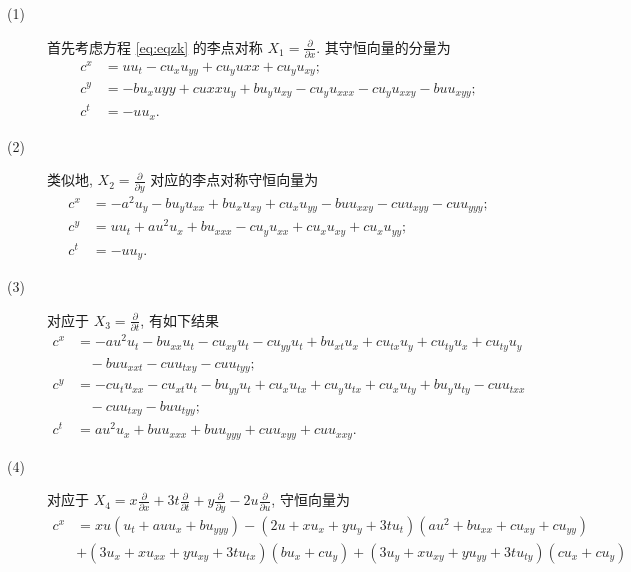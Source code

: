 \begin{description}
 \item[(1)] 首先考虑方程 \eqref{eq:eqzk} 的李点对称 $X_{1}=\frac{\partial}{\partial x}$. 其守恒向量的分量为
\begin{equation*}
\begin{aligned}
c^{x}&=uu_t-cu_xu_{yy}+cu_yu{xx}+cu_yu_{xy};\\
c^{y}&=-bu_xu{yy}+cu{xx}u_y+bu_yu_{xy}-cu_yu_{xxx}-cu_yu_{xxy}-buu_{xyy};\\
c^{t}&=-uu_x.
\end{aligned}
\end{equation*}
 \item[(2)] 类似地, $X_{2}=\frac{\partial}{\partial y}$ 对应的李点对称守恒向量为
\begin{equation*}
\begin{aligned}
c^{x}&=-a^2u_y-bu_yu_{xx}+bu_xu_{xy}+cu_xu_{yy}-buu_{xxy}-cuu_{xyy}-cuu_{yyy};\\
c^{y}&=uu_t+au^2u_x+bu_{xxx}-cu_yu_{xx}+cu_xu_{xy}+cu_xu_{yy};\\
c^{t}&=-uu_y.
\end{aligned}
\end{equation*}
 \item[(3)] 对应于 $X_{3}=\frac{\partial}{\partial t}$, 有如下结果
\begin{equation*}
\begin{aligned}
c^{x}&=-au^2u_t-bu_{xx}u_t-cu_{xy}u_t-cu_{yy}u_t+bu_{xt}u_x+cu_{tx}u_y+cu_{ty}u_x+cu_{ty}u_y\\
&~~~~-buu_{xxt}-cuu_{txy}-cuu_{tyy};\\
c^{y}&=-cu_tu_{xx}-cu_{xt}u_t-bu_{yy}u_t+cu_xu_{tx}+cu_yu_{tx}+cu_xu_{ty}+bu_yu_{ty}-cuu_{txx}\\
&~~~~-cuu_{txy}-buu_{tyy};\\
c^{t}&=au^2u_x+buu_{xxx}+buu_{yyy}+cuu_{xyy}+cuu_{xxy}.
\end{aligned}
\end{equation*}
  \item[(4)] 对应于 $X_{4}=x\frac{\partial}{\partial x}+3t\frac{\partial}{\partial t}+y\frac{\partial}{\partial y}-2u\frac{\partial}{\partial u}$, 守恒向量为
\begin{equation*}
\begin{aligned}
c^{x}&=xu(u_{t}+auu_{x}+bu_{yyy})-(2u+xu_{x}+yu_{y}+3tu_{t})(au^2+bu_{xx}+cu_{xy}+cu_{yy})\\
&+(3u_{x}+xu_{xx}+yu_{xy}+3tu_{tx})(bu_{x}+cu_{y})+(3u_{y}+xu_{xy}+yu_{yy}+3tu_{ty})(cu_{x}+cu_{y})\\

\end{aligned}
\end{equation*}
\end{description}
